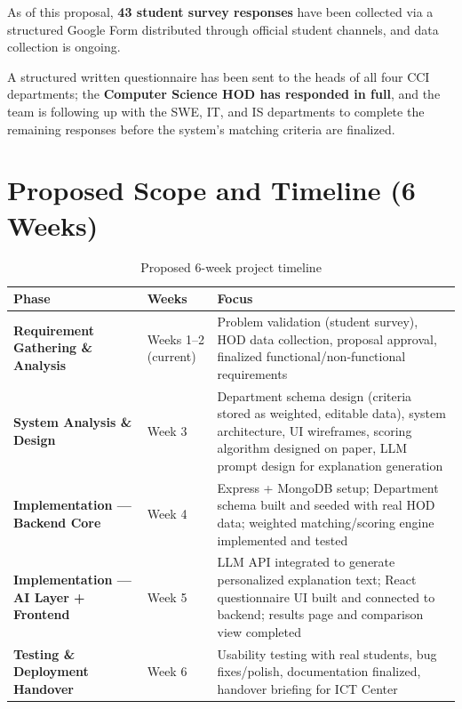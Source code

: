 \documentclass[12pt, a4paper]{article}
\begin{document}
As of this proposal, \textbf{43 student survey responses} have been collected via a structured Google Form distributed through official student channels, and data collection is ongoing. 

A structured written questionnaire has been sent to the heads of all four CCI departments; the \textbf{Computer Science HOD has responded in full}, and the team is following up with the SWE, IT, and IS departments to complete the remaining responses before the system's matching criteria are finalized.

\section{Proposed Scope and Timeline (6 Weeks)}

\begin{table}[H]
\centering
\begin{tabularx}{\textwidth}{>{\bfseries}l>{\centering\arraybackslash}p{2.5cm}X}
\toprule
\textbf{Phase} & \textbf{Weeks} & \textbf{Focus} \\
\midrule
Requirement Gathering \& Analysis & Weeks 1–2 (current) & Problem validation (student survey), HOD data collection, proposal approval, finalized functional/non-functional requirements \\[8pt]

System Analysis \& Design & Week 3 & Department schema design (criteria stored as weighted, editable data), system architecture, UI wireframes, scoring algorithm designed on paper, LLM prompt design for explanation generation \\[8pt]

Implementation — Backend Core & Week 4 & Express + MongoDB setup; Department schema built and seeded with real HOD data; weighted matching/scoring engine implemented and tested \\[8pt]

Implementation — AI Layer + Frontend & Week 5 & LLM API integrated to generate personalized explanation text; React questionnaire UI built and connected to backend; results page and comparison view completed \\[8pt]

Testing \& Deployment Handover & Week 6 & Usability testing with real students, bug fixes/polish, documentation finalized, handover briefing for ICT Center \\
\bottomrule
\end{tabularx}
\caption{Proposed 6-week project timeline}
\end{table}
\end{document}
